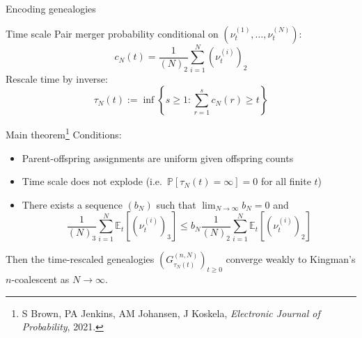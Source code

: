 \documentclass[aspectratio=169]{beamer}
\theoremstyle{definition}
\newcommand{\PR}{\mathbb{P}}
\newcommand{\E}{\mathbb{E}}
\newcommand{\vt}[2][t]{\nu_{#1}^{(#2)}}
\begin{document}
\begin{frame}{Encoding genealogies}
\centering
{}
\end{frame}





\begin{frame}{Time scale}
Pair merger probability conditional on $( \vt{1},\dots, \vt{N} )$:
\begin{equation*}
c_N(t) = \frac{1}{(N)_2} \sum_{i=1}^N (\vt{i})_2
\end{equation*}
\pause
Rescale time by inverse:
\begin{equation*}
\tau_N(t) := \inf\left\{ s\geq 1 : \sum_{r=1}^s c_N(r) \geq t \right\}
\end{equation*}
\end{frame}


\begin{frame}{Main theorem\footnote{S Brown, PA Jenkins, AM Johansen, J Koskela,  \textit{Electronic Journal of Probability}, 2021.}}
Conditions:
\begin{itemize}
\item Parent-offspring assignments are uniform given offspring counts
\pause
\item Time scale does not explode (i.e.\ $\PR[\tau_N(t)=\infty]=0$ for all finite $t$)
\pause
\item There exists a sequence $(b_N)$ such that $\lim_{N\to\infty} b_N = 0$ and
\begin{equation*}
\frac{1}{(N)_3} \sum_{i=1}^N \E_t [ (\vt{i})_3 ]
\leq b_N \frac{1}{(N)_2} \sum_{i=1}^N \E_t [ (\vt{i})_2 ]
\end{equation*}
\end{itemize}
\pause
Then the time-rescaled genealogies $\left( G_{\tau_N(t)}^{(n,N)} \right)_{t\geq0}$ converge weakly to Kingman's $n$-coalescent as $N\to\infty$.
\end{frame}
\end{document}
